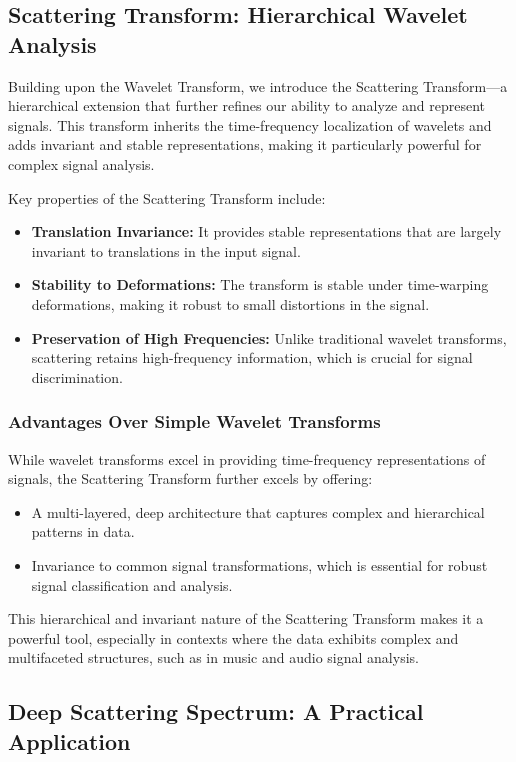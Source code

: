 \subsection{Scattering Transform: Hierarchical Wavelet Analysis}

Building upon the Wavelet Transform, we introduce the Scattering Transform---a hierarchical extension that further refines our ability to analyze and represent signals. This transform inherits the time-frequency localization of wavelets and adds invariant and stable representations, making it particularly powerful for complex signal analysis.

Key properties of the Scattering Transform include:
\begin{itemize}
  \item \textbf{Translation Invariance:} It provides stable representations that are largely invariant to translations in the input signal.
  \item \textbf{Stability to Deformations:} The transform is stable under time-warping deformations, making it robust to small distortions in the signal.
  \item \textbf{Preservation of High Frequencies:} Unlike traditional wavelet transforms, scattering retains high-frequency information, which is crucial for signal discrimination.
\end{itemize}

\subsubsection{Advantages Over Simple Wavelet Transforms}

While wavelet transforms excel in providing time-frequency representations of signals, the Scattering Transform further excels by offering:
\begin{itemize}
  \item A multi-layered, deep architecture that captures complex and hierarchical patterns in data.
  \item Invariance to common signal transformations, which is essential for robust signal classification and analysis.
\end{itemize}

This hierarchical and invariant nature of the Scattering Transform makes it a powerful tool, especially in contexts where the data exhibits complex and multifaceted structures, such as in music and audio signal analysis.

\subsection{Deep Scattering Spectrum: A Practical Application}

